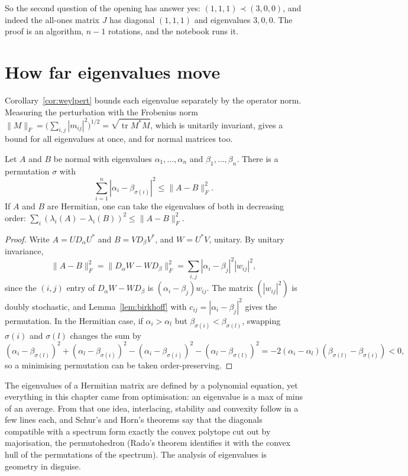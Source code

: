 So the second question of the opening has answer yes: $(1,1,1)\prec(3,0,0)$, and indeed the all-ones matrix $J$ has
diagonal $(1,1,1)$ and eigenvalues $3,0,0$. The proof is an algorithm, $n-1$ rotations, and the notebook runs it.

\section{How far eigenvalues move}

Corollary~\ref{cor:weylpert} bounds each eigenvalue separately by the operator norm. Measuring the perturbation with the
Frobenius norm $\|M\|_F=\bigl(\sum_{i,j}|m_{ij}|^2\bigr)^{1/2}=\sqrt{\operatorname{tr}M^*M}$, which is unitarily invariant, gives
a bound for all eigenvalues at once, and for normal matrices too.

\begin{theorem}\label{thm:hoffmanwielandt}
Let $A$ and $B$ be normal with eigenvalues $\alpha_1,\dots,\alpha_n$ and $\beta_1,\dots,\beta_n$. There is a permutation $\sigma$
with
\[
\sum_{i=1}^n|\alpha_i-\beta_{\sigma(i)}|^2\le\|A-B\|_F^2.
\]
If $A$ and $B$ are Hermitian, one can take the eigenvalues of both in decreasing order: $\sum_i(\lambda_i(A)-\lambda_i(B))^2
\le\|A-B\|_F^2$.
\end{theorem}
\begin{proof}
Write $A=UD_\alpha U^*$ and $B=VD_\beta V^*$, and $W=U^*V$, unitary. By unitary invariance,
\[
\|A-B\|_F^2=\|D_\alpha W-WD_\beta\|_F^2=\sum_{i,j}|\alpha_i-\beta_j|^2|w_{ij}|^2,
\]
since the $(i,j)$ entry of $D_\alpha W-WD_\beta$ is $(\alpha_i-\beta_j)w_{ij}$. The matrix $(|w_{ij}|^2)$ is doubly stochastic,
and Lemma~\ref{lem:birkhoff} with $c_{ij}=|\alpha_i-\beta_j|^2$ gives the permutation. In the Hermitian case, if
$\alpha_i>\alpha_l$ but $\beta_{\sigma(i)}<\beta_{\sigma(l)}$, swapping $\sigma(i)$ and $\sigma(l)$ changes the sum by
\[
(\alpha_i-\beta_{\sigma(l)})^2+(\alpha_l-\beta_{\sigma(i)})^2-(\alpha_i-\beta_{\sigma(i)})^2-(\alpha_l-\beta_{\sigma(l)})^2
=-2(\alpha_i-\alpha_l)(\beta_{\sigma(l)}-\beta_{\sigma(i)})<0,
\]
so a minimising permutation can be taken order-preserving.
\end{proof}

\begin{beauty}
The eigenvalues of a Hermitian matrix are defined by a polynomial equation, yet everything in this chapter came from
optimisation: an eigenvalue is a max of mins of an average. From that one idea, interlacing, stability and convexity follow
in a few lines each, and Schur's and Horn's theorems say that the diagonals compatible with a spectrum form exactly the
convex polytope cut out by majorisation, the permutohedron (Rado's theorem identifies it with the convex hull of the
permutations of the spectrum). The analysis of eigenvalues is geometry in disguise.
\end{beauty}

